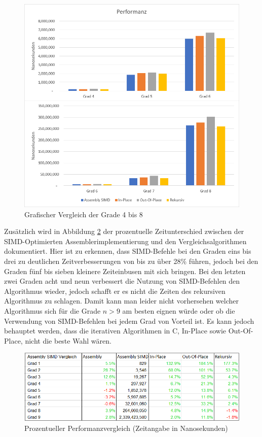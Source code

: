 \documentclass[course=asp]{aspdoc}
\begin{document}
\begin{figure}[ht]
\centering
\includegraphics[scale = 0.5]{diagrammeVertikal.png}
\caption{Grafischer Vergleich der Grade 4 bis 8}\label{Abb: Diagramm Performanz}
\captionsetup[figure]{font=small,labelfont=small}
\end{figure}

Zus\"atzlich wird in Abbildung \ref{Abb: Tabelle Performanz} der prozentuelle Zeitunterschied zwischen der SIMD-Optimierten Assemblerimplementierung und den Vergleichsalgorithmen dokumentiert. Hier ist zu erkennen, dass SIMD-Befehle bei den Graden eins bis drei zu deutlichen Zeitverbesserungen von bis zu \"uber 28\% f\"uhren, jedoch bei den Graden f\"unf bis sieben kleinere Zeiteinbusen mit sich bringen. Bei den letzten zwei Graden acht und neun verbessert die Nutzung von SIMD-Befehlen den Algorithmus wieder, jedoch schafft er es nicht die Zeiten des rekursiven Algorithmus zu schlagen.
Damit kann man leider nicht vorhersehen welcher Algorithmus sich f\"ur die Grade $n > 9$ am besten eignen w\"urde oder ob die Verwendung von SIMD-Befehlen bei jedem Grad von Vorteil ist. Es kann jedoch behauptet werden, dass die iterativen Algorithmen in C, In-Place sowie Out-Of-Place, nicht die beste Wahl w\"aren.

\begin{figure}[ht]
\centering
\includegraphics[scale = 0.65]{zeitmessungenProzent.png}
\caption{Prozentueller Performanzvergleich (Zeitangabe in Nanosekunden)} \label{Abb: Tabelle Performanz}
\captionsetup[figure]{font=small,labelfont=small}
\end{figure}
\end{document}
